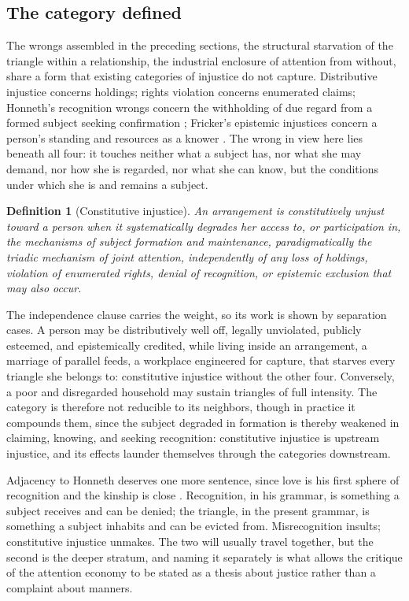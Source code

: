 \documentclass[11pt,a4paper]{article}
\theoremstyle{seriesthm}
\newtheorem{defn}{Definition}
\begin{document}
\subsection{The category defined}

The wrongs assembled in the preceding sections, the structural starvation of the triangle within a relationship, the industrial enclosure of attention from without, share a form that existing categories of injustice do not capture. Distributive injustice concerns holdings; rights violation concerns enumerated claims; Honneth's recognition wrongs concern the withholding of due regard from a formed subject seeking confirmation \parencite{honneth1995}; Fricker's epistemic injustices concern a person's standing and resources as a knower \parencite{fricker2007}. The wrong in view here lies beneath all four: it touches neither what a subject has, nor what she may demand, nor how she is regarded, nor what she can know, but the conditions under which she is and remains a subject.

\begin{defn}[Constitutive injustice]\label{p05:def:ci}
An arrangement is constitutively unjust toward a person when it systematically degrades her access to, or participation in, the mechanisms of subject formation and maintenance, paradigmatically the triadic mechanism of joint attention, independently of any loss of holdings, violation of enumerated rights, denial of recognition, or epistemic exclusion that may also occur.
\end{defn}

The independence clause carries the weight, so its work is shown by separation cases. A person may be distributively well off, legally unviolated, publicly esteemed, and epistemically credited, while living inside an arrangement, a marriage of parallel feeds, a workplace engineered for capture, that starves every triangle she belongs to: constitutive injustice without the other four. Conversely, a poor and disregarded household may sustain triangles of full intensity. The category is therefore not reducible to its neighbors, though in practice it compounds them, since the subject degraded in formation is thereby weakened in claiming, knowing, and seeking recognition: constitutive injustice is upstream injustice, and its effects launder themselves through the categories downstream.

Adjacency to Honneth deserves one more sentence, since love is his first sphere of recognition and the kinship is close \parencite{honneth1995}. Recognition, in his grammar, is something a subject receives and can be denied; the triangle, in the present grammar, is something a subject inhabits and can be evicted from. Misrecognition insults; constitutive injustice unmakes. The two will usually travel together, but the second is the deeper stratum, and naming it separately is what allows the critique of the attention economy to be stated as a thesis about justice rather than a complaint about manners.
\end{document}
